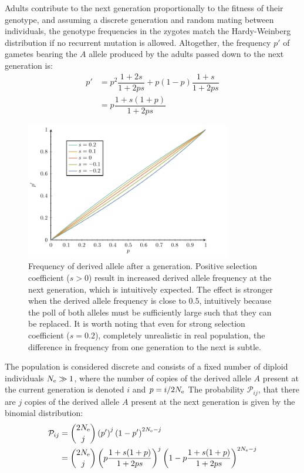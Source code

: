 Adults contribute to the next generation proportionally to the fitness of their genotype, and assuming a discrete generation and random mating between individuals, the genotype frequencies in the zygotes match the Hardy-Weinberg distribution if no recurrent mutation is allowed.
Altogether, the frequency $p'$ of gametes bearing the $A$ \gls{allele} produced by the adults passed down to the next generation is:
\begin{align}
p' & = p^2 \dfrac{1+2s}{1+2ps} + p(1-p)\dfrac{1+s}{1+2ps}\\
& = p\dfrac{1+s(1+p)}{1 + 2ps}
\end{align}

\begin{figure}[H]
	\begin{center}
		\includegraphics[width=0.8\textwidth, page=1] {figures.pdf}
	\end{center}
	\caption[Frequency of derived \gls{allele} after a generation]{Frequency of derived \gls{allele} after a generation. Positive selection coefficient ($s > 0$) result in increased derived \gls{allele} frequency at the next generation, which is intuitively expected. The effect is stronger when the derived \gls{allele} frequency is close to $0.5$, intuitively because the poll of both alleles must be sufficiently large such that they can be replaced. It is worth noting that even for strong selection coefficient ($s=0.2$), completely unrealistic in real population, the difference in frequency from one generation to the next is subtle.}
\end{figure}

The population is considered discrete and consists of a fixed number of \gls{diploid} individuals $N_{\textrm{e}} \gg 1$, where the number of copies of the derived \gls{allele} $A$ present at the current generation is denoted $i$ and $p=i / 2N_{\textrm{e}} $ 
The probability $\mathcal{P}_{ij}$, that there are $j$ copies of the derived \gls{allele} $A$ present at the next generation is given by the binomial distribution:
\begin{align}
\mathcal{P}_{ij} & = \binom{2 N_{\textrm{e}}}{j} \left( p' \right)^j \left(1 - p' \right)^{2 N_{\textrm{e}} -j} \\
				 & = \binom{2 N_{\textrm{e}}}{j} \left( p\dfrac{1+s(1+p)}{1 + 2ps} \right)^j \left(1 - p\dfrac{1+s(1+p)}{1 + 2ps} \right)^{2 N_{\textrm{e}} -j}
\end{align}

